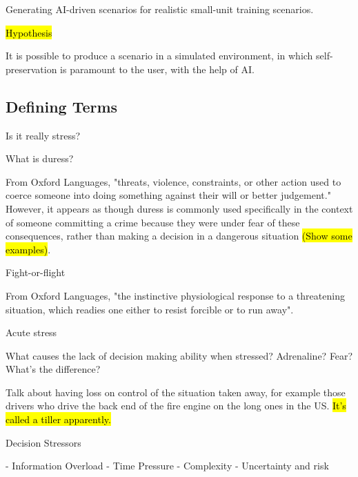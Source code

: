 \documentclass{article}
\begin{document}
  Generating AI-driven scenarios for realistic small-unit training scenarios. 
  
  \hl{Hypothesis}
  
  It is possible to produce a scenario in a simulated environment, in which self-preservation is paramount to the user, with the help of AI.
  
  
  \subsection{Defining Terms}
  

  Is it really stress?

  What is duress?

  From Oxford Languages, "threats, violence, constraints, or other action used to coerce someone into doing something against their will or better judgement." However, it appears as though duress is commonly used specifically in the context of someone committing a crime because they were under fear of these consequences, rather than making a decision in a dangerous situation \hl{(Show some examples)}.

  

  Fight-or-flight

  From Oxford Languages, "the instinctive physiological response to a threatening situation, which readies one either to resist forcible or to run away".


  Acute stress

  What causes the lack of decision making ability when stressed? Adrenaline? Fear? What's the difference?



  Talk about having loss on control of the situation taken away, for example those drivers who drive the back end of the fire engine on the long ones in the US. \hl{It's called a tiller apparently.}


  Decision Stressors

  - Information Overload
  - Time Pressure
  - Complexity
  - Uncertainty and risk
\end{document}
